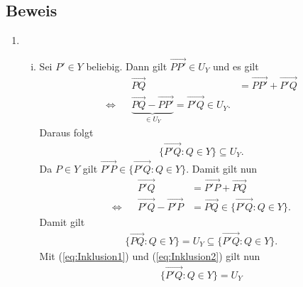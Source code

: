 \documentclass[11pt]{article}
\begin{document}
\subsection*{Beweis}
\begin{enumerate}[1)]
	\item
	\begin{enumerate}[i)]
		\item Sei $ P' \in Y $ beliebig. Dann gilt $ \overrightarrow{PP'} \in U_Y $ und es gilt
		\begin{equation*}
		\begin{aligned}
		&& \overrightarrow{PQ} &= \overrightarrow{PP'} + \overrightarrow{P'Q}\\
		\Leftrightarrow && \underbrace{\overrightarrow{PQ} - \overrightarrow{PP'}}_{\in U_Y} = \overrightarrow{P'Q} \in U_Y.
		\end{aligned}
		\end{equation*}
		Daraus folgt
		\begin{equation}
		\begin{aligned}
		\lbrace \overrightarrow{P'Q} : Q \in Y \rbrace \subseteq U_Y. \label{eq:Inklusion1}
		\end{aligned}
		\end{equation}
		Da $ P \in Y $ gilt $ \overrightarrow{P'P} \in \lbrace \overrightarrow{P'Q} : Q \in Y \rbrace $. Damit gilt nun
		\begin{equation*}
		\begin{aligned}
		&& \overrightarrow{P'Q} &= \overrightarrow{P'P} + \overrightarrow{PQ}\\
		\Leftrightarrow && \overrightarrow{P'Q} - \overrightarrow{P'P} &= \overrightarrow{PQ} \in 	\lbrace \overrightarrow{P'Q} : Q \in Y \rbrace.
		\end{aligned}
		\end{equation*}
		Damit gilt
		\begin{equation}
		\begin{aligned}
		\lbrace \overrightarrow{PQ} : Q \in Y \rbrace = U_Y \subseteq \lbrace \overrightarrow{P'Q} : Q \in Y \rbrace. \label{eq:Inklusion2}
		\end{aligned}
		\end{equation}
		Mit (\ref{eq:Inklusion1}) und (\ref{eq:Inklusion2}) gilt nun
		\begin{equation*}
		\begin{aligned}
		\lbrace \overrightarrow{P'Q} : Q \in Y \rbrace = U_Y
		\end{aligned}
		\end{equation*}

\end{enumerate}
\end{enumerate}
\end{document}
